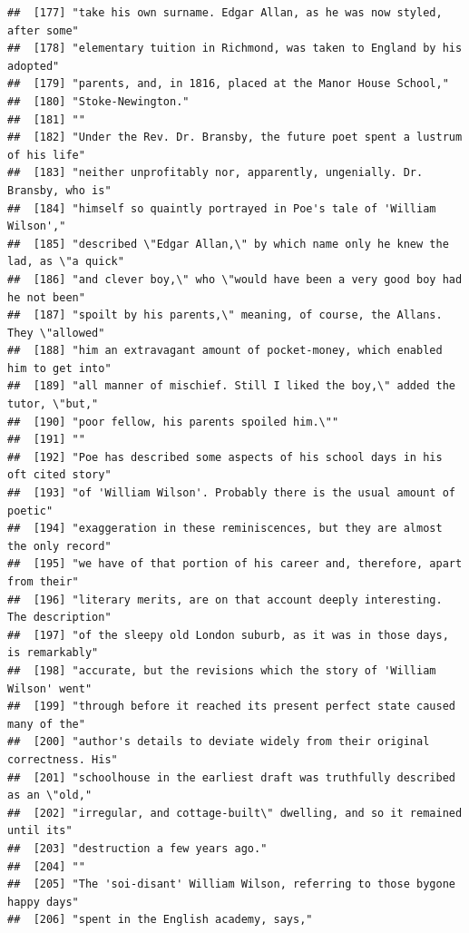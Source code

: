 \documentclass{article}\usepackage[]{graphicx}\usepackage[]{color}
\makeatletter
\newenvironment{kframe}{%
 \def\at@end@of@kframe{}%
 \ifinner\ifhmode%
  \def\at@end@of@kframe{\end{minipage}}%
  \begin{minipage}{\columnwidth}%
 \fi\fi%
 \def\FrameCommand##1{\hskip\@totalleftmargin \hskip-\fboxsep
 \colorbox{shadecolor}{##1}\hskip-\fboxsep
     \hskip-\linewidth \hskip-\@totalleftmargin \hskip\columnwidth}%
 \MakeFramed {\advance\hsize-\width
   \@totalleftmargin\z@ \linewidth\hsize
   \@setminipage}}%
 {\par\unskip\endMakeFramed%
 \at@end@of@kframe}
\newenvironment{knitrout}{}{} %
\makeatother
\begin{document}
\begin{knitrout}
\begin{kframe}
\begin{verbatim}
##  [177] "take his own surname. Edgar Allan, as he was now styled, after some"         
##  [178] "elementary tuition in Richmond, was taken to England by his adopted"         
##  [179] "parents, and, in 1816, placed at the Manor House School,"                    
##  [180] "Stoke-Newington."                                                            
##  [181] ""                                                                            
##  [182] "Under the Rev. Dr. Bransby, the future poet spent a lustrum of his life"     
##  [183] "neither unprofitably nor, apparently, ungenially. Dr. Bransby, who is"       
##  [184] "himself so quaintly portrayed in Poe's tale of 'William Wilson',"            
##  [185] "described \"Edgar Allan,\" by which name only he knew the lad, as \"a quick" 
##  [186] "and clever boy,\" who \"would have been a very good boy had he not been"     
##  [187] "spoilt by his parents,\" meaning, of course, the Allans. They \"allowed"     
##  [188] "him an extravagant amount of pocket-money, which enabled him to get into"    
##  [189] "all manner of mischief. Still I liked the boy,\" added the tutor, \"but,"    
##  [190] "poor fellow, his parents spoiled him.\""                                     
##  [191] ""                                                                            
##  [192] "Poe has described some aspects of his school days in his oft cited story"    
##  [193] "of 'William Wilson'. Probably there is the usual amount of poetic"           
##  [194] "exaggeration in these reminiscences, but they are almost the only record"    
##  [195] "we have of that portion of his career and, therefore, apart from their"      
##  [196] "literary merits, are on that account deeply interesting. The description"    
##  [197] "of the sleepy old London suburb, as it was in those days, is remarkably"     
##  [198] "accurate, but the revisions which the story of 'William Wilson' went"        
##  [199] "through before it reached its present perfect state caused many of the"      
##  [200] "author's details to deviate widely from their original correctness. His"     
##  [201] "schoolhouse in the earliest draft was truthfully described as an \"old,"     
##  [202] "irregular, and cottage-built\" dwelling, and so it remained until its"       
##  [203] "destruction a few years ago."                                                
##  [204] ""                                                                            
##  [205] "The 'soi-disant' William Wilson, referring to those bygone happy days"       
##  [206] "spent in the English academy, says,"                                         

\end{verbatim}
\end{kframe}
\end{knitrout}
\end{document}
